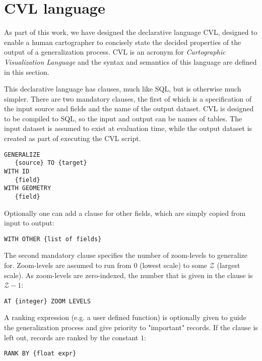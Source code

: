 \section{CVL language}
\label{sec:language}

As part of this work, we have designed the declarative language CVL, designed to enable a human cartographer to concisely state the decided properties of the output of a generalization process. CVL is an acronym for \emph{Cartographic Visualization Language} and the syntax and semantics of this language are defined in this section.

This declarative language has clauses, much like SQL, but is otherwise much simpler. There are two mandatory clauses, the first of which is a specification of the input source and fields and the name of the output dataset. CVL is designed to be compiled to SQL, so the input and output can be names of tables. The input dataset is assumed to exist at evaluation time, while the output dataset is created as part of executing the CVL script.

\begin{lstlisting}
GENERALIZE 
   {source} TO {target}
WITH ID
   {field}
WITH GEOMETRY 
   {field}
\end{lstlisting}

Optionally one can add a clause for other fields, which are simply copied from input to output:

\begin{lstlisting}
WITH OTHER {list of fields}
\end{lstlisting}

The second mandatory clause specifies the number of zoom-levels to generalize for. Zoom-levels are assumed to run from 0 (lowest scale) to some $\mathcal{Z}$ (largest scale). As zoom-levels are zero-indexed, the number that is given in the clause is $\mathcal{Z}-1$:

\begin{lstlisting}
AT {integer} ZOOM LEVELS
\end{lstlisting}

A ranking expression (e.g. a user defined function) is optionally given to guide the generalization process and give priority to "important" records. If the clause is left out, records are ranked by the constant $1$:

\begin{lstlisting}
RANK BY {float expr}
\end{lstlisting}

